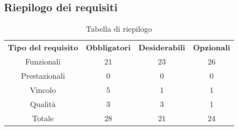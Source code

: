 \subsection{Riepilogo dei requisiti}
\begin{table}[h]
\centering
\begin{tabular}{| c | c | c | c |}
		\rowcolor{LightBlue}
		\color{white}\bfseries Tipo del requisito & \color{white}\bfseries Obbligatori & \color{white}\bfseries Desiderabili & \color{white}\bfseries Opzionali \\[0.25cm]
		 Funzionali & 21 & 23 & 26 \\
		 Prestazionali & 0 & 0 & 0 \\
		 Vincolo & 5 & 1 & 1 \\
		 Qualità & 3 & 3 & 1 \\
		 Totale & 28 & 21 & 24 \\ \hline
\end{tabular}
		\caption{Tabella di riepilogo}
\end{table}


\newpage